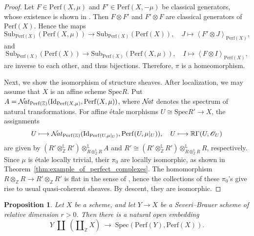 \documentclass[11pt]{amsart}
\theoremstyle{definition}
\theoremstyle{plain}
\newtheorem{prop}[defn]{Proposition}
\theoremstyle{remark}
\newcommand{\perf}{\mathrm{Perf}}
\newcommand{\Spec}{\mathrm{Spec}}
\newcommand{\Sub}{\mathrm{Sub}}
\newcommand{\sO}{\mathscr{O}}
\newcommand{\rd}{\mathbb{R}}
\newcommand{\dotimes}{\otimes^{\mathbb{L}}}
\newcommand{\sNat}{\mathcal{N}\hspace{-0.08cm}\mathit{at}}
\newcommand{\Id}{\mathrm{Id}}
\newcommand{\ang}[1]{{\left\langle{#1}\right\rangle}}
\numberwithin{equation}{section}
\begin{document}
\begin{proof}
Let \(F\in \perf(X,\mu)\) and \(F'\in \perf(X,-\mu)\) be classical generators, whose existence is shown in \cite{To2}.
Then \(F\otimes F'\) and \(F'\otimes F\) are classical generators of \(\perf(X)\).
Hence the maps
\[
\Sub_{\perf(X)}(\perf(X,\mu))\to \Sub_{\perf(X)}(\perf(X)),\quad
J\mapsto \ang{F'\otimes J}_{\perf(X)},
\]
and
\[
\Sub_{\perf(X)}(\perf(X))\to \Sub_{\perf(X)}(\perf(X,\mu)),\quad
I\mapsto \ang{F\otimes I}_{\perf(X)},
\]
are inverse to each other, and thus bijections.
Therefore, \(\pi\) is a homeomorphism.

Next, we show the isomorphism of structure sheaves.  
After localization, we may assume that \(X\) is an affine scheme \(\Spec R\).  
Put \(A=\sNat_{\perf(\mathbb{Z})}(\Id_{\perf(X,\mu)},\perf(X,\mu))\), where \(\sNat\) denotes the spectrum of natural transformations.  
For affine étale morphisms \(U\cong \Spec R' \to X\), the assignments
\[
U\longmapsto \sNat_{\perf(\mathbb{Z})}(\Id_{\perf(U,\mu|_U)},\perf(U,\mu|_U)), 
\quad
U\longmapsto \rd \Gamma(U,\sO_U)
\]
are given by \((R'\dotimes_{\mathbb{Z}} R')\dotimes_{R\dotimes_{\mathbb{Z}}R}A\) and \(R' \cong (R'\dotimes_{\mathbb{Z}}R')\dotimes_{R\dotimes_{\mathbb{Z}}R}R\), respectively.  
Since \(\mu\) is étale locally trivial, their \(\pi_0\) are locally isomorphic, as shown in Theorem~\ref{thm:example_of_perfect_complexes}.  
The homomorphism \(R\otimes_{\mathbb{Z}}R \to R'\otimes_{\mathbb{Z}}R'\) is flat in the sense of \cite{Lu2}, hence the collections of these \(\pi_0\)'s give rise to usual quasi-coherent sheaves.
By descent, they are isomorphic.
\end{proof}

\begin{prop}\label{prop:Severi-Brauer_scheme}
Let \(X\) be a scheme, and let \(Y\to X\) be a Severi--Brauer scheme of relative dimension \(r>0\).
Then there is a natural open embedding
\[
Y\;\amalg\; \left(\amalg_\mathbb{Z} X\right)\;\longrightarrow\; \Spec(\perf(Y),\perf(X)).
\]
\end{prop}
\end{document}
